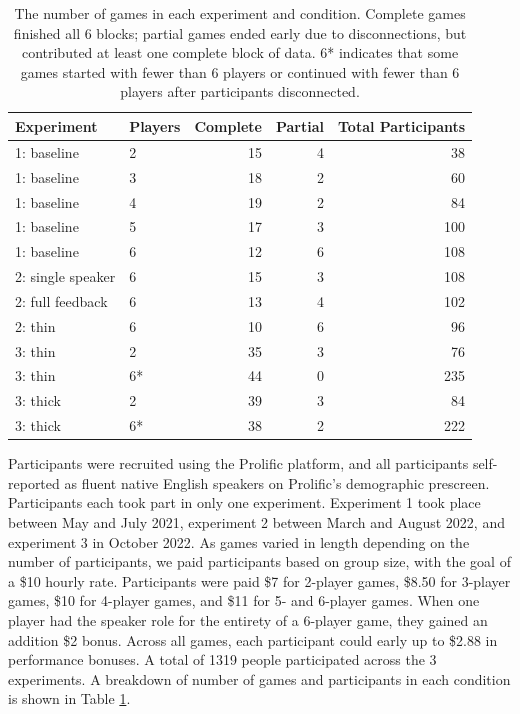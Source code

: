 \documentclass[
  english,
  a4paper,
]{article}
\begin{document}
\begin{table}

\caption{\label{tab:participants}The number of games in each experiment and condition. Complete games finished all 6 blocks; partial games ended early due to disconnections, but contributed at least one complete block of data. 6* indicates that some games started with fewer than 6 players or continued with fewer than 6 players after participants disconnected.}
\centering
\begin{tabular}[t]{l|l|r|r|r}
\hline
Experiment & Players & Complete & Partial & Total Participants\\
\hline
1: baseline & 2 & 15 & 4 & 38\\
\hline
1: baseline & 3 & 18 & 2 & 60\\
\hline
1: baseline & 4 & 19 & 2 & 84\\
\hline
1: baseline & 5 & 17 & 3 & 100\\
\hline
1: baseline & 6 & 12 & 6 & 108\\
\hline
2: single speaker & 6 & 15 & 3 & 108\\
\hline
2: full feedback & 6 & 13 & 4 & 102\\
\hline
2: thin & 6 & 10 & 6 & 96\\
\hline
3: thin & 2 & 35 & 3 & 76\\
\hline
3: thin & 6* & 44 & 0 & 235\\
\hline
3: thick & 2 & 39 & 3 & 84\\
\hline
3: thick & 6* & 38 & 2 & 222\\
\hline
\end{tabular}
\end{table}

Participants were recruited using the Prolific platform, and all participants self-reported as fluent native English speakers on Prolific's demographic prescreen. Participants each took part in only one experiment. Experiment 1 took place between May and July 2021, experiment 2 between March and August 2022, and experiment 3 in October 2022. As games varied in length depending on the number of participants, we paid participants based on group size, with the goal of a \$10 hourly rate. Participants were paid \$7 for 2-player games, \$8.50 for 3-player games, \$10 for 4-player games, and \$11 for 5- and 6-player games. When one player had the speaker role for the entirety of a 6-player game, they gained an addition \$2 bonus. Across all games, each participant could early up to \$2.88 in performance bonuses. A total of 1319 people participated across the 3 experiments. A breakdown of number of games and participants in each condition is shown in Table \ref{tab:participants}.
\end{document}
